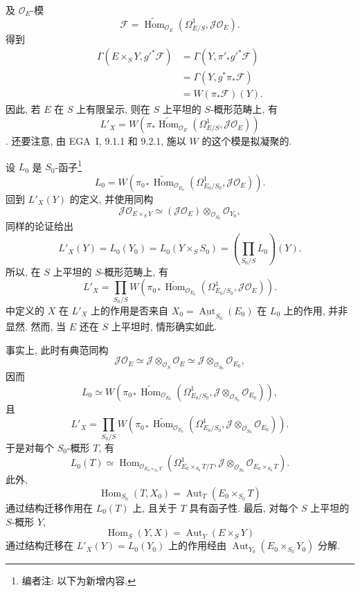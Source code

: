 及 \(\mathscr O_E\)-模
\[
 \mathscr F=
 \widetilde{\operatorname{Hom}}_{\mathscr O_E}
 \left(\Omega^1_{E/S},\mathscr J\mathscr O_E\right).
\]
得到
\begin{align*}
 \Gamma(E\times_S Y,g'^*\mathscr F)
 &=\Gamma(Y,\pi'_*g'^*\mathscr F)\\
 &=\Gamma(Y,g^*\pi_*\mathscr F)\\
 &=W(\pi_*\mathscr F)(Y).
\end{align*}
因此, 若 \(E\) 在 \(S\) 上有限呈示,
则在 \(S\) 上平坦的 \(S\)-概形范畴上, 有
\begin{equation}
 L'_X=
 W\!\left(
   \pi_*\widetilde{\operatorname{Hom}}_{\mathscr O_E}
   (\Omega^1_{E/S},\mathscr J\mathscr O_E)
 \right)
 \tag{0.14.1}\label{sga3:iii:remark:0-14:equation:0-14-1}
\end{equation}
. 还要注意, 由 EGA~I, 9.1.1 和 9.2.1,
施以 \(W\) 的这个模是拟凝聚的.

设 \(L_0\) 是 \(S_0\)-函子\footnote{编者注: 以下为新增内容.}
\[
 L_0=
 W\!\left(
   \pi_{0*}\widetilde{\operatorname{Hom}}_{\mathscr O_{E_0}}
   (\Omega^1_{E_0/S_0},\mathscr J\mathscr O_E)
 \right).
\]
回到 \(L'_X(Y)\) 的定义, 并使用同构
\[
 \mathscr J\mathscr O_{E\times_S Y}
 \simeq(\mathscr J\mathscr O_E)
       \otimes_{\mathscr O_{S_0}}\mathscr O_{Y_0},
\]
同样的论证给出
\[
 L'_X(Y)=L_0(Y_0)=L_0(Y\times_S S_0)
 =\left(\prod_{S_0/S}L_0\right)(Y).
\]
所以, 在 \(S\) 上平坦的 \(S\)-概形范畴上, 有
\[
 L'_X=
 \prod_{S_0/S}
 W\!\left(
   \pi_{0*}\widetilde{\operatorname{Hom}}_{\mathscr O_{E_0}}
   (\Omega^1_{E_0/S_0},\mathscr J\mathscr O_E)
 \right).
\]
 中定义的 \(X\) 在
\(L'_X\) 上的作用是否来自
\(X_0=\underline{\operatorname{Aut}}_{S_0}(E_0)\) 在 \(L_0\) 上的作用,
并非显然. 然而, 当 \(E\) 还在 \(S\) 上平坦时, 情形确实如此.

事实上, 此时有典范同构
\[
 \mathscr J\mathscr O_E
 \simeq\mathscr J\otimes_{\mathscr O_S}\mathscr O_E
 \simeq\mathscr J\otimes_{\mathscr O_{S_0}}\mathscr O_{E_0},
\]
因而
\[
 L_0\simeq
 W\!\left(
   \pi_{0*}\widetilde{\operatorname{Hom}}_{\mathscr O_{E_0}}
   \left(
     \Omega^1_{E_0/S_0},
     \mathscr J\otimes_{\mathscr O_{S_0}}\mathscr O_{E_0}
   \right)
 \right),
\]
且
\begin{equation}
 L'_X=
 \prod_{S_0/S}
 W\!\left(
   \pi_{0*}\widetilde{\operatorname{Hom}}_{\mathscr O_{E_0}}
   \left(
     \Omega^1_{E_0/S_0},
     \mathscr J\otimes_{\mathscr O_{S_0}}\mathscr O_{E_0}
   \right)
 \right).
 \tag{0.14.2}\label{sga3:iii:remark:0-14:equation:0-14-2}
\end{equation}
于是对每个 \(S_0\)-概形 \(T\), 有
\[
 L_0(T)\simeq
 \operatorname{Hom}_{\mathscr O_{E_0\times_{S_0}T}}
 \left(
   \Omega^1_{E_0\times_{S_0}T/T},
   \mathscr J\otimes_{\mathscr O_{S_0}}
     \mathscr O_{E_0\times_{S_0}T}
 \right).
\]
此外,
\[
 \operatorname{Hom}_{S_0}(T,X_0)
 =\operatorname{Aut}_T(E_0\times_{S_0}T)
\]
通过结构迁移作用在 \(L_0(T)\) 上, 且关于 \(T\) 具有函子性.
最后, 对每个 \(S\) 上平坦的 \(S\)-概形 \(Y\),
\[
 \operatorname{Hom}_S(Y,X)=\operatorname{Aut}_Y(E\times_S Y)
\]
通过结构迁移在 \(L'_X(Y)=L_0(Y_0)\) 上的作用经由
\(\operatorname{Aut}_{Y_0}(E_0\times_{S_0}Y_0)\) 分解.

